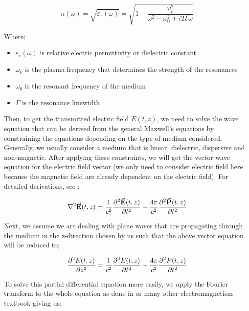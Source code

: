 \begin{equation}
    n(\omega) = \sqrt{\varepsilon_{r}(\omega)} = \sqrt{1 - \frac{\omega_{p}^{2}}{\omega^{2} - \omega_{0}^{2} + i2\Gamma\omega}}
    \label{eqn: nw}
\end{equation}

Where;

\begin{itemize}
    \item $\varepsilon_{r}(\omega)$ is relative electric permittivity or dielectric constant
    \item $\omega_{p}$ is the plasma frequency that determines the strength of the resonances
    \item $\omega_{0}$ is the resonant frequency of the medium
    \item $\Gamma$ is the resonance linewidth
\end{itemize}

Then, to get the transmitted electric field $E(t, z)$, we need to solve the wave equation that can be derived from the general Maxwell's equations by constraining the equations depending on the type of medium considered. Generally, we usually consider a medium that is linear, dielectric, dispersive and non-magnetic. After applying these constraints, we will get the vector wave equation for the electric field vector (we only need to consider electric field here because the magnetic field are already dependent on the electric field). For detailed derivations, see \cite{jackson1999classical};

\begin{equation}
    \laplacian{\va{E}(t, z)} = \frac{1}{c^2} \pdv[2]{\va{E}(t, z)}{t} + \frac{4\pi}{c^2} \pdv[2]{\va{P}(t, z)}{t}
\end{equation}

Next, we assume we are dealing with plane waves that are propagating through the medium in the z-direction chosen by us such that the above vector equation will be reduced to;

\begin{equation}
    \pdv[2]{E(t, z)}{z} = \frac{1}{c^2} \pdv[2]{E(t, z)}{t} + \frac{4\pi}{c^2} \pdv[2]{P(t, z)}{t}
    \label{eqn: scalarMaxwellWaveEquation}
\end{equation}

To solve this partial differential equation more easily, we apply the Fourier transform to the whole equation as done in \cite{jackson1999classical} or many other electromagnetism textbook giving us;

